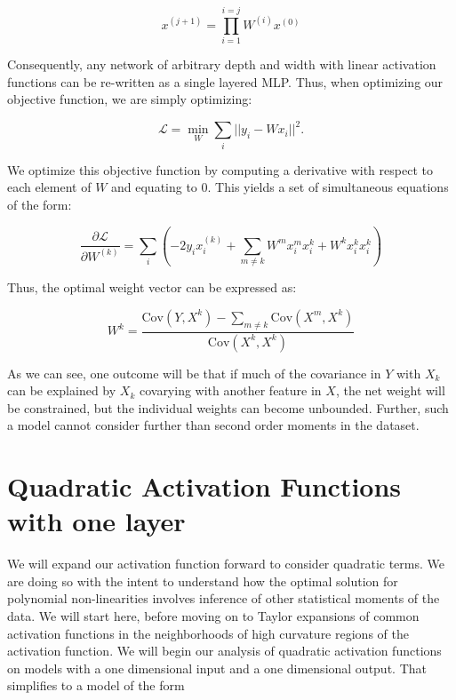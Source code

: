 \documentclass{article}
\begin{document}
\begin{equation}
x^{(j+1)} = \prod_{i=1}^{i=j} W^{(i)} x^{(0)}
\end{equation}

Consequently, any network of arbitrary depth and width with linear activation functions can be re-written as a single layered MLP. Thus, when optimizing our objective function, we are simply optimizing:

\begin{equation}
\mathcal{L} = \min_{W} \sum_{i} || y_{i} - W x_{i}||^{2}.
\end{equation}

We optimize this objective function by computing a derivative with respect to each element of $W$ and equating to $0$. This yields a set of simultaneous equations of the form:

\begin{equation}
\frac{\partial\mathcal{L}}{\partial W^{(k)}} = \sum_{i} (-2y_{i} x^{(k)}_{i} + \sum_{m\neq k} W^{m} x_{i}^{m}x_{i}^{k}  + W^{k} x^{k}_{i} x^{k}_{i})
\end{equation}

Thus, the optimal weight vector can be expressed as:

\begin{equation}
W^{k} = \frac{\mathrm{Cov}(Y, X^{k}) - \sum_{m\neq k}\mathrm{Cov}(X^{m}, X^{k})}{\mathrm{Cov}(X^{k}, X^{k})}
\end{equation}

As we can see, one outcome will be that if much of the covariance in $Y$ with $X_k$ can be explained by $X_k$ covarying with another feature in $X$, the net weight will be constrained, but the individual weights can become unbounded. Further, such a model cannot consider further than second order moments in the dataset. 

\section{Quadratic Activation Functions with one layer}

We will expand our activation function forward to consider quadratic terms. We are doing so with the intent to understand how the optimal solution for polynomial non-linearities involves inference of other statistical moments of the data. We will start here, before moving on to Taylor expansions of common activation functions in the neighborhoods of high curvature regions of the activation function. We will begin our analysis of quadratic activation functions on models with a one dimensional input and a one dimensional output. That simplifies to a model of the form
\end{document}
